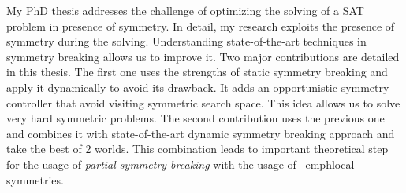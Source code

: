 %
%
%
My PhD thesis addresses the challenge of optimizing the solving of a SAT problem in presence of
symmetry. In detail, my research exploits the presence of symmetry during the solving.
Understanding state-of-the-art techniques in symmetry breaking allows us to improve it.
Two major contributions are detailed in this thesis. The first one uses the strengths of static symmetry 
breaking and apply it dynamically to avoid its drawback. It adds an opportunistic symmetry controller 
that avoid visiting symmetric search space. This idea allows us to solve very hard symmetric problems.
The second contribution uses the previous one and combines it with state-of-the-art dynamic 
symmetry breaking approach and take the best of 2 worlds. This combination leads to 
important theoretical step for the usage of \emph{partial symmetry breaking} with the usage of 
\ emph{local symmetries}. 
 
